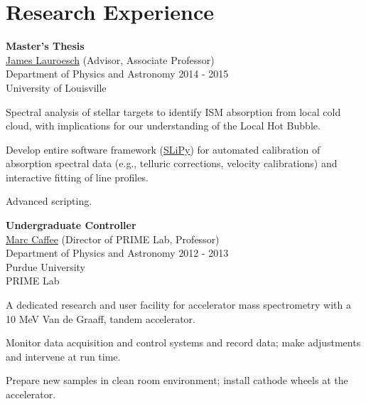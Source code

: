 

\section*{Research Experience}



\Experience
{
	\textbf{Master's Thesis}\\
	\href{http://www.physics.louisville.edu/jtl/}{James Lauroesch}
	(Advisor, Associate Professor)\\
	Department of Physics and Astronomy
}
{
	2014 - 2015\\
	University of Louisville
}
{
	\item Spectral analysis of stellar targets to identify ISM absorption from local cold
	cloud, with implications for our understanding of the Local Hot Bubble.

	\item Develop entire software framework (\href{http://github.com/glentner/slipy}{SLiPy})
	for automated calibration of absorption spectral data (e.g., telluric corrections,
	velocity calibrations) and interactive fitting of line profiles.

	\item Advanced scripting.
}






\Experience
{
	\textbf{Undergraduate Controller}\\
	\href{http://www.physics.purdue.edu/people/faculty/mcaffee.html}{Marc Caffee}
	(Director of PRIME Lab, Professor)\\
	Department of Physics and Astronomy
}
{
	2012 - 2013\\
	Purdue University\\
	PRIME Lab
}
{
	\item A dedicated research and user facility for accelerator
	mass spectrometry with a 10 MeV Van de Graaff, tandem accelerator.

	\item Monitor data acquisition and control systems and record data; make adjustments
	and intervene at run time.

	\item Prepare new samples in clean room environment; install cathode wheels at the
	accelerator.
}




